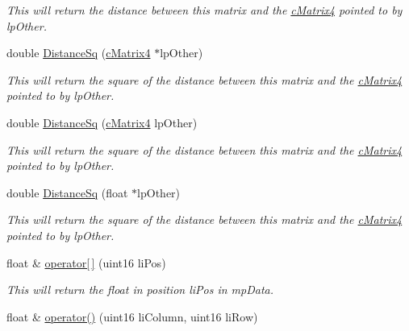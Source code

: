 \begin{DoxyCompactItemize}
\begin{DoxyCompactList}\small\item\em This will return the distance between this matrix and the \hyperlink{classc_matrix4}{cMatrix4} pointed to by lpOther. \end{DoxyCompactList}\item 
\hypertarget{classc_matrix4_afb4a1edc36d2de9330e48bd182fe2a9b}{
double \hyperlink{classc_matrix4_afb4a1edc36d2de9330e48bd182fe2a9b}{DistanceSq} (\hyperlink{classc_matrix4}{cMatrix4} $\ast$lpOther)}
\label{classc_matrix4_afb4a1edc36d2de9330e48bd182fe2a9b}

\begin{DoxyCompactList}\small\item\em This will return the square of the distance between this matrix and the \hyperlink{classc_matrix4}{cMatrix4} pointed to by lpOther. \end{DoxyCompactList}\item 
\hypertarget{classc_matrix4_ad225d8db157a99b593f774e08c266722}{
double \hyperlink{classc_matrix4_ad225d8db157a99b593f774e08c266722}{DistanceSq} (\hyperlink{classc_matrix4}{cMatrix4} lpOther)}
\label{classc_matrix4_ad225d8db157a99b593f774e08c266722}

\begin{DoxyCompactList}\small\item\em This will return the square of the distance between this matrix and the \hyperlink{classc_matrix4}{cMatrix4} pointed to by lpOther. \end{DoxyCompactList}\item 
\hypertarget{classc_matrix4_ac524fac9525c6ff780e95c648b229e41}{
double \hyperlink{classc_matrix4_ac524fac9525c6ff780e95c648b229e41}{DistanceSq} (float $\ast$lpOther)}
\label{classc_matrix4_ac524fac9525c6ff780e95c648b229e41}

\begin{DoxyCompactList}\small\item\em This will return the square of the distance between this matrix and the \hyperlink{classc_matrix4}{cMatrix4} pointed to by lpOther. \end{DoxyCompactList}\item 
\hypertarget{classc_matrix4_a4b91a4d790f5a0decc76d41e54b80049}{
float \& \hyperlink{classc_matrix4_a4b91a4d790f5a0decc76d41e54b80049}{operator\mbox{[}$\,$\mbox{]}} (uint16 liPos)}
\label{classc_matrix4_a4b91a4d790f5a0decc76d41e54b80049}

\begin{DoxyCompactList}\small\item\em This will return the float in position liPos in mpData. \end{DoxyCompactList}\item 
\hypertarget{classc_matrix4_a1e17bf69091f804aec716524dbdec375}{
float \& \hyperlink{classc_matrix4_a1e17bf69091f804aec716524dbdec375}{operator()} (uint16 liColumn, uint16 liRow)}
\label{classc_matrix4_a1e17bf69091f804aec716524dbdec375}


\end{DoxyCompactItemize}
